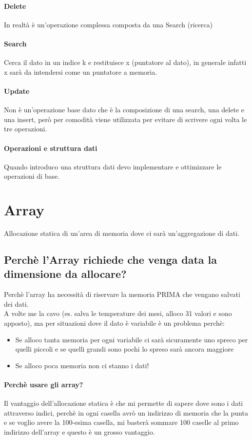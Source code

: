 \paragraph*{Delete} In realtà è un'operazione complessa composta da una Search (ricerca)
\paragraph*{Search} Cerca il dato in un indice k e restituisce x (puntatore al dato),
in generale infatti x sarà da intendersi come un puntatore a memoria.
\paragraph*{Update} Non è un'operazione base dato che è la composizione di una search, una delete e una
insert, però per comodità viene utilizzata per evitare di scrivere ogni volta le tre operazioni.
\paragraph*{Operazioni e struttura dati} Quando introduco una struttura dati devo implementare e ottimizzare le
operazioni di base.
\section{Array}
Allocazione statica di un'area di memoria dove ci sarà un'aggregazione di dati.
\subsection{Perchè l'Array richiede che venga data la dimensione da allocare?}
Perchè l'array ha necessità di riservare la memoria PRIMA che vengano salvati dei dati.\\
A volte me la cavo (es. salva le temperature dei mesi, alloco 31 valori e sono apposto), ma
per situazioni dove il dato è variabile è un problema perchè:
\begin{itemize}
    \item Se alloco tanta memoria per ogni variabile ci sarà sicuramente uno spreco
    per quelli piccoli e se quelli grandi sono pochi lo spreso sarà ancora maggiore
    \item Se alloco poca memoria non ci stanno i dati!
\end{itemize}
\paragraph*{Perchè usare gli array?}
Il vantaggio dell'allocazione statica è che mi permette di sapere dove sono i dati attraverso indici,
perchè in ogni casella avrò un indirizzo di memoria che la punta e se voglio avere la 100-esima casella,
mi basterà sommare 100 caselle al primo indirizzo dell'array e questo è un grosso vantaggio.
